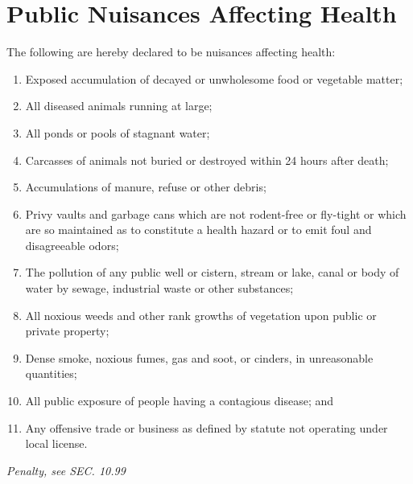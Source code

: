 \documentclass[code.tex]{subfiles}
\begin{document}
\section{Public Nuisances Affecting Health}
The following are hereby declared to be nuisances affecting health:
\begin{enumerate}[{\indent}A)]
    \item Exposed accumulation of decayed or unwholesome food or vegetable matter;
    \item All diseased animals running at large;
    \item All ponds or pools of stagnant water;
    \item Carcasses of animals not buried or destroyed within 24 hours after death;
    \item Accumulations of manure, refuse or other debris;
    \item Privy vaults and garbage cans which are not rodent-free or fly-tight or which are so maintained as to constitute a health hazard or to emit foul and disagreeable odors;
    \item The pollution of any public well or cistern, stream or lake, canal or body of water by sewage, industrial waste or other substances;
    \item All noxious weeds and other rank growths of vegetation upon public or private property;
    \item Dense smoke, noxious fumes, gas and soot, or cinders, in unreasonable quantities;
    \item All public exposure of people having a contagious disease; and
    \item Any offensive trade or business as defined by statute not operating under local license.
\end{enumerate}
\emph{Penalty, see SEC. 10.99}
\end{document}
